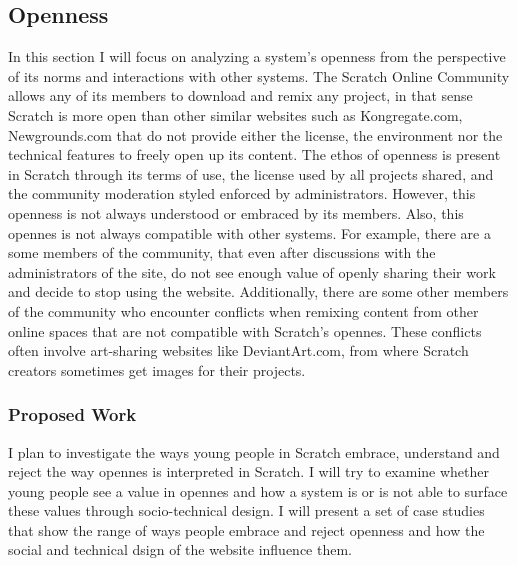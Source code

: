 \subsection{Openness}
In this section I will focus on analyzing a system's openness from the perspective of its norms and interactions with other systems.
The Scratch Online Community allows any of its members to download and remix any project, in that sense Scratch is more open than other similar websites such as Kongregate.com, Newgrounds.com that do not provide either the license, the environment nor the technical features to freely open up its content. 
The ethos of openness is present in Scratch through its terms of use, the license used by all projects shared, and the community moderation styled enforced by administrators.
However, this openness is not always understood or embraced by its members.
Also, this opennes is not always compatible with other systems.
For example, there are a some members of the community, that even after discussions with the administrators of the site, do not see enough value of openly sharing their work and decide to stop using the website. 
Additionally, there are some other members of the community who encounter conflicts when remixing content from other online spaces that are not compatible with Scratch's opennes. 
These conflicts often involve art-sharing websites like DeviantArt.com, from where Scratch creators sometimes get images for their projects.

\subsubsection{Proposed Work}
I plan to investigate the ways young people in Scratch embrace, understand and reject the way opennes is interpreted in Scratch.
I will try to examine whether young people see a value in opennes and how a system is or is not able to surface these values through socio-technical design.
I will present a set of case studies that show the range of ways people embrace and reject openness and how the social and technical dsign of the website influence them. 

